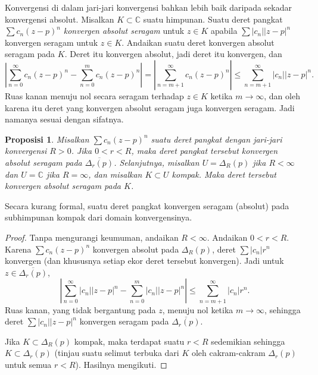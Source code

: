 \documentclass[12pt,openany]{book}
\newcommand{\sabs}[1]{\lvert {#1} \rvert}
\newcommand{\abs}[1]{\left\lvert {#1} \right\rvert}
\newcommand{\C}{{\mathbb{C}}}
\theoremstyle{plain}
\newtheorem{prop}[thm]{Proposisi}
\theoremstyle{remark}
\theoremstyle{definition}
\theoremstyle{exercise}
\theoremstyle{example}
\begin{document}
Konvergensi di dalam jari-jari konvergensi bahkan lebih baik daripada sekadar konvergensi absolut.
Misalkan $K \subset \C$ suatu himpunan.
Suatu deret pangkat $\sum c_n {(z-p)}^n$
\emph{konvergen absolut seragam}%
%
untuk $z \in K$ apabila $\sum \sabs{c_n} \sabs{z-p}^n$
konvergen seragam untuk $z \in K$.
Andaikan suatu deret konvergen absolut seragam pada $K$.  Deret itu konvergen absolut,
jadi deret itu konvergen, dan
\begin{equation*}
\abs{
\sum_{n=0}^\infty c_n {(z-p)}^n
-
\sum_{n=0}^{m} c_n {(z-p)}^n
}
=
\abs{\sum_{n=m+1}^\infty c_n {(z-p)}^n} \leq
\sum_{n=m+1}^\infty \sabs{c_n} \sabs{z-p}^n .
\end{equation*}
Ruas kanan menuju nol secara seragam terhadap $z \in K$ ketika $m \to \infty$,
dan oleh karena itu
deret yang konvergen absolut seragam juga konvergen
seragam.  Jadi namanya sesuai dengan sifatnya.

\begin{prop}
Misalkan $\sum c_n {(z-p)}^n$ suatu deret pangkat dengan jari-jari konvergensi $R
> 0$.  Jika $0 < r < R$, maka deret pangkat tersebut konvergen absolut seragam
pada $\overline{\Delta_r(p)}$. Selanjutnya, misalkan $U = \Delta_R(p)$ jika $R < \infty$ dan
$U = \C$ jika $R=\infty$, dan misalkan $K \subset U$ kompak.
Maka deret tersebut konvergen absolut seragam pada $K$.
\end{prop}

Secara kurang formal, suatu deret pangkat konvergen seragam (absolut) pada
subhimpunan kompak dari domain konvergensinya.

\begin{proof}
Tanpa mengurangi keumuman, andaikan $R < \infty$.
Andaikan $0 < r < R$.  Karena $\sum c_n {(z-p)}^n$ konvergen absolut
pada $\Delta_R(p)$, deret
$\sum \sabs{c_n} r^n$ konvergen (dan khususnya setiap ekor
deret tersebut konvergen).  Jadi untuk $z \in \overline{\Delta_r(p)}$,
\begin{equation*}
\abs{
\sum_{n=0}^\infty \sabs{c_n} \sabs{z-p}^n
-
\sum_{n=0}^{m} \sabs{c_n} \sabs{z-p}^n
}
\leq
\sum_{n=m+1}^\infty \sabs{c_n} r^n .
\end{equation*}
Ruas kanan, yang tidak bergantung pada $z$,
menuju nol ketika $m \to \infty$, sehingga
deret $\sum \sabs{c_n} \sabs{z-p}^n$ konvergen seragam
pada $\overline{\Delta_r(p)}$.

Jika $K \subset \Delta_{R}(p)$ kompak, maka terdapat suatu $r <
R$ sedemikian sehingga $K \subset \Delta_r(p)$ (tinjau suatu selimut terbuka
dari $K$ oleh cakram-cakram $\Delta_r(p)$ untuk semua $r < R$).  Hasilnya mengikuti.
\end{proof}
\end{document}
